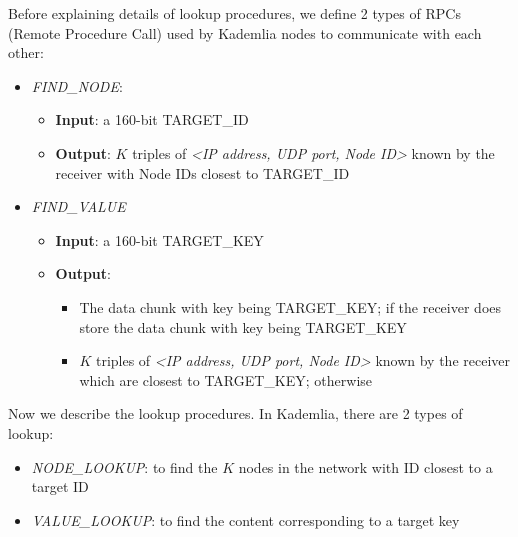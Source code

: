 Before explaining details of lookup procedures, we define 2 types of RPCs (Remote Procedure Call) used by Kademlia nodes to communicate with each other:
\begin{itemize}
  \item \textit{FIND\_NODE}:
  \begin{itemize}
    \item \textbf{Input}: a 160-bit TARGET\_ID
    \item \textbf{Output}: $K$ triples of \textit{<IP address, UDP port, Node ID>} known by the receiver with Node IDs closest to TARGET\_ID
  \end{itemize}
  \item \textit{FIND\_VALUE}
  \begin{itemize}
    \item \textbf{Input}: a 160-bit TARGET\_KEY
    \item \textbf{Output}: 
    \begin{itemize}
      \item The data chunk with key being TARGET\_KEY; if the receiver does store the data chunk with key being TARGET\_KEY
      \item $K$ triples of \textit{<IP address, UDP port, Node ID>} known by the receiver which are closest to TARGET\_KEY; otherwise
    \end{itemize}
  \end{itemize}
\end{itemize}

\noindent Now we describe the lookup procedures. In Kademlia, there are 2 types of lookup:
\begin{itemize}
  \item \textit{NODE\_LOOKUP}: to find the $K$ nodes in the network with ID closest to a target ID
  \item \textit{VALUE\_LOOKUP}: to find the content corresponding to a target key
\end{itemize}

